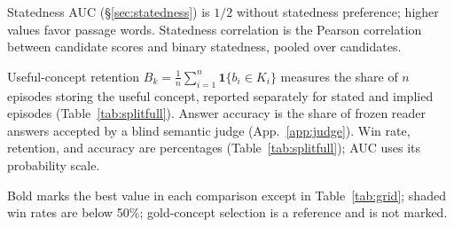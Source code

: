 Statedness AUC (\S\ref{sec:statedness}) is $1/2$ without statedness preference; higher values favor passage words. Statedness correlation is the Pearson correlation between candidate scores and binary statedness, pooled over candidates.

Useful-concept retention $B_k=\frac{1}{n}\sum_{i=1}^{n}\mathbf{1}\{b_i\in K_i\}$ measures the share of $n$ episodes storing the useful concept, reported separately for stated and implied episodes (Table~\ref{tab:splitfull}). Answer accuracy is the share of frozen reader answers accepted by a blind semantic judge (App.~\ref{app:judge}). Win rate, retention, and accuracy are percentages (Table~\ref{tab:splitfull}); AUC uses its probability scale.

Bold marks the best value in each comparison except in Table~\ref{tab:grid}; shaded win rates are below 50\%; gold-concept selection is a reference and is not marked.
